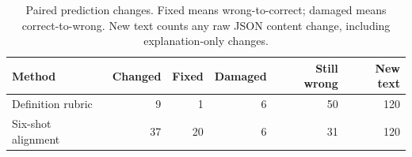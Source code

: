\begin{table}[H]\centering\small
\begin{tabular}{lrrrrr}
\toprule
Method & Changed & Fixed & Damaged & Still wrong & New text\\
\midrule
Definition rubric & 9 & 1 & 6 & 50 & 120\\
Six-shot alignment & 37 & 20 & 6 & 31 & 120\\
\bottomrule\end{tabular}
\caption{Paired prediction changes. Fixed means wrong-to-correct; damaged means correct-to-wrong. New text counts any raw JSON content change, including explanation-only changes.}
\end{table}
